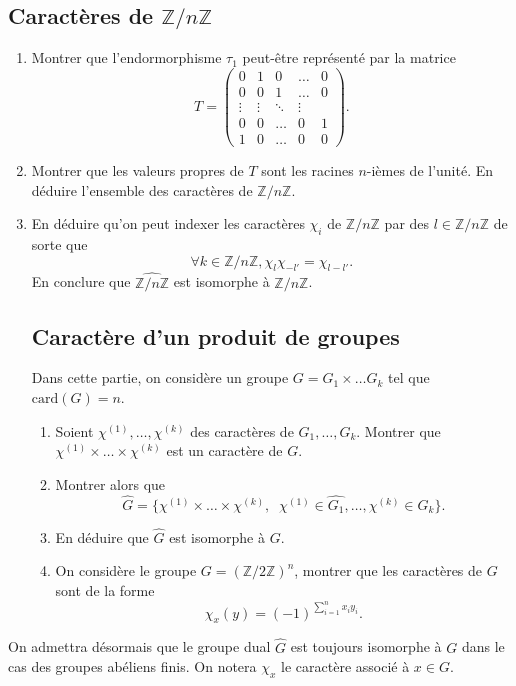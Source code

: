 \documentclass{article}[a4paper]
\newcommand{\Z}{\mathbb{Z}}
\begin{document}
\subsection{Caractères de \(\Z/n\Z\)}
\begin{enumerate}
    \item Montrer que l'endormorphisme \(\tau_1\) peut-être représenté par la matrice 
    \begin{equation*}
        T = \begin{pmatrix}
            0 & 1 & 0 & \dots & 0\\
            0 & 0 & 1 & \dots & 0\\
            \vdots & \vdots & \ddots & \vdots\\
            0 & 0 & \dots & 0 & 1\\
            1 & 0 & \dots & 0 & 0
        \end{pmatrix}.
    \end{equation*}
    \item Montrer que les valeurs propres de \(T\) sont les racines \(n\)-ièmes de l'unité.
    En déduire l'ensemble des caractères de \(\Z/n\Z\).
    \item En déduire qu'on peut indexer les caractères \(\chi_i\) de \(\Z/n\Z\) par des 
    \(l\in \Z/n\Z\) de sorte que 
    \begin{equation*}
        \forall k\in \Z/n\Z, \chi_l\chi_{-l'} = \chi_{l-l'}.
    \end{equation*}
    En conclure que \(\widehat{\Z/n\Z}\) est isomorphe à \(\Z/n\Z\).
    \subsection{Caractère d'un produit de groupes}
    Dans cette partie, on considère un groupe \(G = G_1\times \dots G_k\) tel que 
    \(\mathrm{card}(G) = n\).
    \begin{enumerate}
        \item Soient \(\chi^{(1)},\dots,\chi^{(k)}\) des caractères de \(G_1,\dots, G_k\).
        Montrer que \(\chi^{(1)}\times\dots\times\chi^{(k)} \) est un caractère de \(G\).
        \item Montrer alors que 
        \begin{equation*}
            \widehat{G} = \{\chi^{(1)}\times\dots\times\chi^{(k)},\;\; \chi^{(1)}\in \widehat{G_1},\dots, \chi^{(k)}\in \widehat{G_k}\}.
        \end{equation*}
        \item En déduire que \(\widehat{G}\) est isomorphe à \(G\).
        \item On considère le groupe \(G = (\Z/2\Z)^n\), montrer que les caractères de \(G\)
        sont de la forme 
        \begin{equation*}
            \chi_x(y) = (-1)^{\sum_{i=1}^n x_iy_i}.
        \end{equation*}
    \end{enumerate}
\end{enumerate}
On admettra désormais que le groupe dual \(\widehat{G}\) est 
toujours isomorphe à \(G\) dans le cas des groupes abéliens finis. On notera 
\(\chi_x\) le caractère associé à \(x\in G\). 
\end{document}
